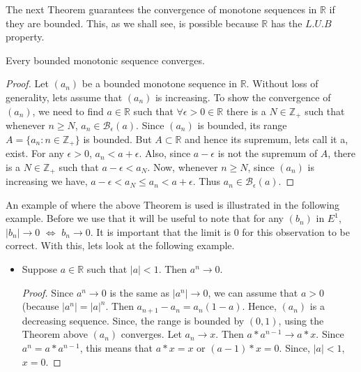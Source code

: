 The next Theorem guarantees the convergence of monotone sequences in $\mathbb{R}$ 
if they are bounded. This, as we shall see, is possible because $\mathbb{R}$ has the $L.U.B$ 
property. 
\begin{Theorem}[name=Bounded monotone sequences]
    Every bounded monotonic sequence converges.
\end{Theorem}
\begin{proof}
    Let $\left(a_n\right)$ be a bounded monotone sequence in $\mathbb{R}$. Without loss of generality, 
    lets assume that $\left(a_n\right)$ is increasing. To show the convergence of
    $\left(a_n\right)$, we need to find $a \in \mathbb{R}$ such that $\forall \epsilon > 0 \in
    \mathbb{R}$ there is a $N \in \mathbb{Z}_+$ such that whenever $n \geq N$, $a_n \in
    \mathcal{B}_{\epsilon}(a)$. Since $\left(a_n\right)$ is bounded, its range $A = \left.\lbrace a_n
	: n \in \mathbb{Z}_+ \rbrace\right.$ is bounded. But $A \subset \mathbb{R}$ and hence its
  supremum, lets call it a, exist. For any $\epsilon > 0$, $a_n < a + \epsilon$. Also, since $a -
  \epsilon$ is not the supremum of $A$, there is a $N \in \mathbb{Z}_+$ such that $a - \epsilon <
  a_N$. Now, whenever $n \geq N$, since $\left(a_n\right)$ is increasing we have, $a - \epsilon <
  a_N \leq a_n < a + \epsilon$. Thus $a_n \in \mathcal{B}_{\epsilon}(a)$.  
\end{proof}
An example of where the above Theorem is used is illustrated in the following example. Before we
use that it will be useful to note that for any $\left(b_n\right)$ in $E^1$, $\lvert b_n \rvert
\rightarrow 0$ $\Leftrightarrow$ $b_n \rightarrow 0$. It is important that the limit is $0$ for this
observation to be correct. With this, lets look at the following example.
\begin{itemize}
    \item Suppose $a \in \mathbb{R}$ such that $\lvert a \rvert < 1$. Then $a^n \rightarrow 0$.
    \begin{proof}
	Since $a^n \rightarrow 0$ is the same as $\lvert a^n \rvert \rightarrow 0$, we can assume
that $a > 0$ (because $\lvert a^n \rvert = \lvert a \rvert ^n$. Then $a_{n+1} - a_n = a_n(1 - a)$.
Hence, $\left(a_n\right)$ is a decreasing sequence. Since, the range is bounded by $(0,1)$, using
the Theorem above $\left(a_n\right)$ converges. Let $a_n \rightarrow x$. Then $a*a^{n-1} \rightarrow
a*x$. Since $a^n = a*a^{n-1}$, this means that $a*x = x$ or $(a-1)*x = 0$. Since, 
$\lvert a \rvert < 1$, $x = 0$.
    \end{proof}
\end{itemize}

